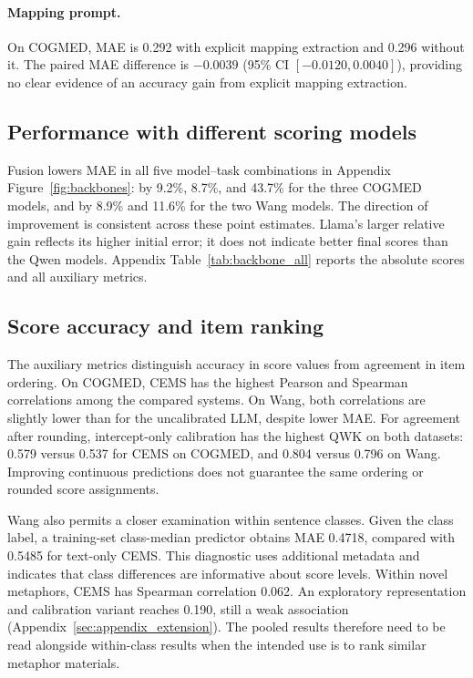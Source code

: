 \paragraph{Mapping prompt.}
On COGMED, MAE is 0.292 with explicit mapping extraction and 0.296 without it. The paired MAE difference is $-0.0039$ (95\% CI $[-0.0120,0.0040]$), providing no clear evidence of an accuracy gain from explicit mapping extraction.

\subsection{Performance with different scoring models}

Fusion lowers MAE in all five model--task combinations in Appendix Figure~\ref{fig:backbones}: by 9.2\%, 8.7\%, and 43.7\% for the three COGMED models, and by 8.9\% and 11.6\% for the two Wang models. The direction of improvement is consistent across these point estimates. Llama's larger relative gain reflects its higher initial error; it does not indicate better final scores than the Qwen models. Appendix Table~\ref{tab:backbone_all} reports the absolute scores and all auxiliary metrics.



\subsection{Score accuracy and item ranking}

The auxiliary metrics distinguish accuracy in score values from agreement in item ordering. On COGMED, CEMS has the highest Pearson and Spearman correlations among the compared systems. On Wang, both correlations are slightly lower than for the uncalibrated LLM, despite lower MAE. For agreement after rounding, intercept-only calibration has the highest QWK on both datasets: 0.579 versus 0.537 for CEMS on COGMED, and 0.804 versus 0.796 on Wang. Improving continuous predictions does not guarantee the same ordering or rounded score assignments.

Wang also permits a closer examination within sentence classes. Given the class label, a training-set class-median predictor obtains MAE 0.4718, compared with 0.5485 for text-only CEMS. This diagnostic uses additional metadata and indicates that class differences are informative about score levels. Within novel metaphors, CEMS has Spearman correlation 0.062. An exploratory representation and calibration variant reaches 0.190, still a weak association (Appendix~\ref{sec:appendix_extension}). The pooled results therefore need to be read alongside within-class results when the intended use is to rank similar metaphor materials.
